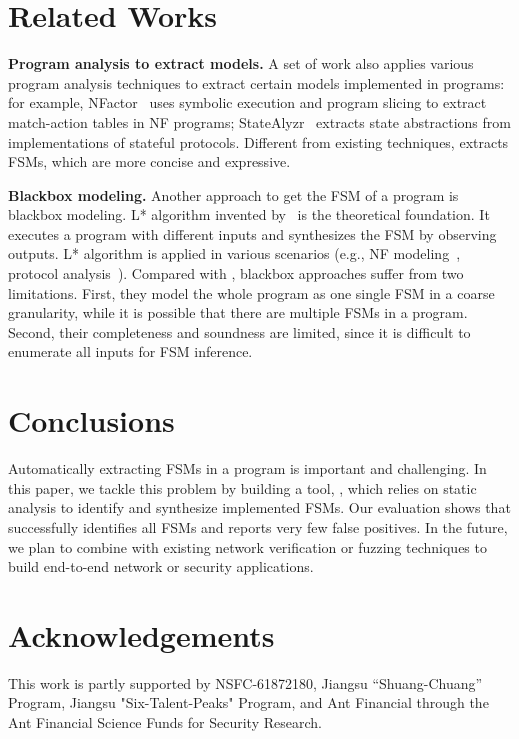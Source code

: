 \section{Related Works}
\label{sec:related}

\noindent\textbf{Program analysis to extract models.}
A set of work also applies various program analysis techniques
to extract certain models implemented in programs:
for example, NFactor~\cite{wu2016automatic}
uses symbolic execution and program slicing to extract match-action
tables in NF programs;
StateAlyzr~\cite{khalid2016paving} extracts state abstractions
from implementations of stateful protocols.
Different from existing techniques, \Tool{} extracts FSMs,
which are more concise and expressive.

\noindent\textbf{Blackbox modeling.}
Another approach to get the FSM of a program is blackbox modeling.
L* algorithm invented by~\citet{angluin1987learning}
is the theoretical foundation.
It executes a program with different inputs and
synthesizes the FSM by observing outputs.
L* algorithm is applied in various scenarios
(e.g., NF modeling~\cite{moon2019alembic},
protocol analysis~\cite{cho2011mace}).
Compared with \Tool{}, blackbox approaches suffer from two limitations.
First, they model the whole program as one single FSM in a coarse granularity,
while it is possible that there are multiple FSMs in a program.
Second, their completeness and soundness are limited,
since it is difficult to enumerate all inputs for
FSM inference.



\section{Conclusions}

Automatically extracting FSMs in a program is important
and challenging.
In this paper, we tackle this problem by building a tool, \Tool{},
which relies on static analysis to identify and synthesize implemented FSMs.
Our evaluation shows that \Tool{} successfully identifies all FSMs and
reports very few false positives.
In the future, we plan to combine \Tool{} with existing network verification
or fuzzing techniques to build end-to-end network or security applications.



\section{Acknowledgements}
This work is partly supported by NSFC-61872180, Jiangsu “Shuang-Chuang” Program, Jiangsu "Six-Talent-Peaks" Program, and Ant
Financial through the Ant Financial Science Funds for Security Research.




